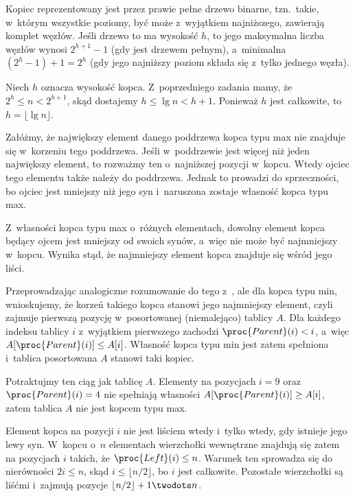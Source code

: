 
\exercise %
Kopiec reprezentowany jest przez prawie pełne drzewo binarne, tzn.\ takie, w~którym wszystkie poziomy, być może z~wyjątkiem najniższego, zawierają komplet węzłów.
Jeśli drzewo to ma wysokość $h$, to jego maksymalna liczba węzłów wynosi $2^{h+1}-1$ (gdy jest drzewem pełnym), a~minimalna $(2^h-1)+1=2^h$ (gdy jego najniższy poziom składa się z~tylko jednego węzła).

\exercise %
Niech $h$ oznacza wysokość kopca.
Z~poprzedniego zadania mamy, że $2^h\le n<2^{h+1}$, skąd dostajemy $h\le\lg n<h+1$.
Ponieważ $h$ jest całkowite, to $h=\lfloor\lg n\rfloor$.

\exercise %
Załóżmy, że największy element danego poddrzewa kopca typu max nie znajduje się w~korzeniu tego poddrzewa.
Jeśli w~poddrzewie jest więcej niż jeden największy element, to rozważmy ten o~najniższej pozycji w~kopcu.
Wtedy ojciec tego elementu także należy do poddrzewa.
Jednak to prowadzi do sprzeczności, bo ojciec jest mniejszy niż jego syn i~naruszona zostaje własność kopca typu max.

\exercise %
Z~własności kopca typu max o~różnych elementach, dowolny element kopca będący ojcem jest mniejszy od swoich synów, a~więc nie może być najmniejszy w~kopcu.
Wynika stąd, że najmniejszy element kopca znajduje się wśród jego liści.

\exercise %
Przeprowadzając analogiczne rozumowanie do tego z~, ale dla kopca typu min, wnioskujemy, że korzeń takiego kopca stanowi jego najmniejszy element, czyli zajmuje pierwszą pozycję w~posortowanej (niemalejąco) tablicy $A$.
Dla każdego indeksu tablicy $i$ z~wyjątkiem pierwszego zachodzi $\proc{Parent}(i)<i$, a~więc $A[\proc{Parent}(i)]\le A[i]$.
Własność kopca typu min jest zatem spełniona i~tablica posortowana $A$ stanowi taki kopiec.

\exercise %
Potraktujmy ten ciąg jak tablicę $A$.
Elementy na pozycjach $i=9$ oraz $\proc{Parent}(i)=4$ nie spełniają własności $A[\proc{Parent}(i)]\ge A[i]$, zatem tablica $A$ nie jest kopcem typu max.

\exercise %
Element kopca na pozycji $i$ nie jest liściem wtedy i~tylko wtedy, gdy istnieje jego lewy syn.
W~kopcu o~$n$ elementach wierzchołki wewnętrzne znajdują się zatem na pozycjach $i$ takich, że $\proc{Left}(i)\le n$.
Warunek ten sprowadza się do nierówności $2i\le n$, skąd $i\le\lfloor n/2\rfloor$, bo $i$ jest całkowite.
Pozostałe wierzchołki są liśćmi i~zajmują pozycje $\lfloor n/2\rfloor+1\twodots n$.
